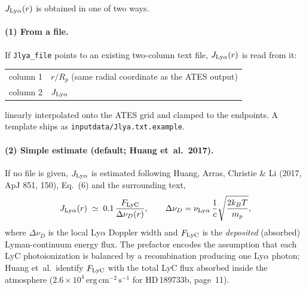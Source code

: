 \documentclass[english,a4paper]{kiseon_memo}
\begin{document}
$J_{\rm Ly\alpha}(r)$ is obtained in one of two ways.

\paragraph{(1) From a file.} If \texttt{Jlya\_file} points to an existing
two-column text file, $J_{\rm Ly\alpha}(r)$ is read from it:
\begin{center}
\begin{tabular}{ll}
column 1 & $r/R_p$ \quad(same radial coordinate as the ATES output) \\
column 2 & $J_{\rm Ly\alpha}$  \\
\end{tabular}
\end{center}
\begin{sloppypar}
linearly interpolated onto the ATES grid and clamped to the endpoints.
A template ships as \texttt{inputdata/Jlya.txt.example}.
\end{sloppypar}

\paragraph{(2) Simple estimate (default; Huang et~al.~2017).} If no file
is given, $J_{\rm Ly\alpha}$ is estimated following Huang, Arras,
Christie \& Li (2017, ApJ 851, 150), Eq.~(6) and the surrounding text,
\[
  J_{\rm Ly\alpha}(r) \;\simeq\; 0.1\,\frac{F_{\rm LyC}}{\Delta\nu_D(r)},
  \qquad
  \Delta\nu_D = \nu_{\rm Ly\alpha}\,\frac{1}{c}\sqrt{\frac{2k_BT}{m_p}},
\]
where $\Delta\nu_D$ is the local Ly$\alpha$ Doppler width and
$F_{\rm LyC}$ is the \emph{deposited} (absorbed) Lyman-continuum energy
flux. The prefactor encodes the assumption that each LyC photoionization
is balanced by a recombination producing one Ly$\alpha$ photon; Huang
et~al.\ identify $F_{\rm LyC}$ with the total LyC flux absorbed inside
the atmosphere ($2.6\times10^{4}\,\mathrm{erg\,cm^{-2}\,s^{-1}}$ for
HD\,189733b, page~11).
\end{document}
